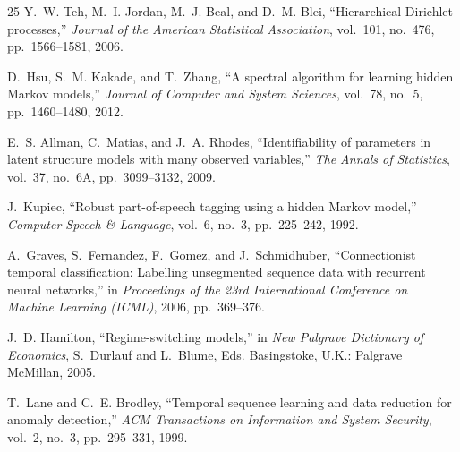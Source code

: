 \documentclass[conference]{IEEEtran}
\begin{document}
\begin{thebibliography}{25}
Y.~W. Teh, M.~I. Jordan, M.~J. Beal, and D.~M. Blei,
``Hierarchical Dirichlet processes,''
\emph{Journal of the American Statistical Association}, vol.~101, no.~476, pp.~1566--1581, 2006.

D.~Hsu, S.~M. Kakade, and T.~Zhang,
``A spectral algorithm for learning hidden Markov models,''
\emph{Journal of Computer and System Sciences}, vol.~78, no.~5, pp.~1460--1480, 2012.

E.~S. Allman, C.~Matias, and J.~A. Rhodes,
``Identifiability of parameters in latent structure models with many observed variables,''
\emph{The Annals of Statistics}, vol.~37, no.~6A, pp.~3099--3132, 2009.

J.~Kupiec,
``Robust part-of-speech tagging using a hidden Markov model,''
\emph{Computer Speech \& Language}, vol.~6, no.~3, pp.~225--242, 1992.

A.~Graves, S.~Fernandez, F.~Gomez, and J.~Schmidhuber,
``Connectionist temporal classification: Labelling unsegmented sequence data with recurrent neural networks,''
in \emph{Proceedings of the 23rd International Conference on Machine Learning (ICML)}, 2006, pp.~369--376.

J.~D. Hamilton,
``Regime-switching models,''
in \emph{New Palgrave Dictionary of Economics}, S.~Durlauf and L.~Blume, Eds.
Basingstoke, U.K.: Palgrave McMillan, 2005.

T.~Lane and C.~E. Brodley,
``Temporal sequence learning and data reduction for anomaly detection,''
\emph{ACM Transactions on Information and System Security}, vol.~2, no.~3, pp.~295--331, 1999.

\end{thebibliography}
\end{document}
